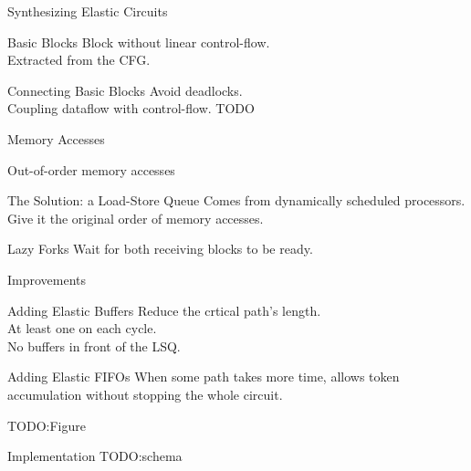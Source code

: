 \documentclass[page number]{beamer}
\begin{document}
\begin{frame}{Synthesizing Elastic Circuits}
  \begin{block}{Basic Blocks}
    Block without linear control-flow.\\
    Extracted from the CFG.
  \end{block}
  \vfill
  \begin{block}{Connecting Basic Blocks}
    Avoid deadlocks.\\
    Coupling dataflow with control-flow.
    TODO
  \end{block}
      
\end{frame}

\begin{frame}{Memory Accesses}
  \begin{alertblock}{Out-of-order memory accesses}
  \end{alertblock}
  \vfill
  \begin{exampleblock}{The Solution: a Load-Store Queue}
    Comes from dynamically scheduled processors.\\
    Give it the original order of memory accesses.
  \end{exampleblock}
  \vfill
  \begin{block}{Lazy Forks}
    Wait for both receiving blocks to be ready.
  \end{block}
    
\end{frame}

\begin{frame}{Improvements}
  \begin{block}{Adding Elastic Buffers}
    Reduce the crtical path's length.\\
    At least one on each cycle.\\
    No buffers in front of the LSQ.
  \end{block}
  \vfill
  \begin{block}{Adding Elastic FIFOs}
    When some path takes more time, allows token accumulation without stopping the whole circuit.
  \end{block}
  \vfill
  TODO:Figure
\end{frame}

\begin{frame}{Implementation}
  TODO:schema
\end{frame}
\end{document}
